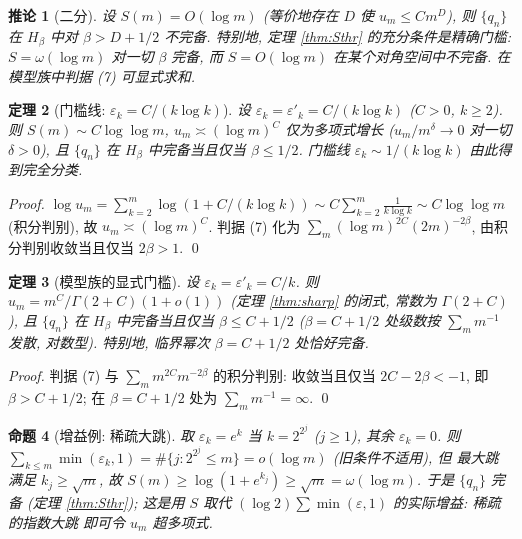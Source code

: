 \documentclass[UTF8]{ctexart}
\newtheorem{theorem}{定理}[section]
\newtheorem{corollary}[theorem]{推论}
\newtheorem{proposition}[theorem]{命题}
\begin{document}
\begin{corollary}[二分]\label{cor:di}
	设 $S(m) = O(\log m)$ (等价地存在 $D$ 使 $u_m \leq C m^D$),
	则 $\{q_n\}$ 在 $H_\beta$ 中对 $\beta > D + 1/2$ 不完备.
	特别地, 定理 \ref{thm:Sthr} 的充分条件是\emph{精确门槛}:
	$S = \omega(\log m)$ 对一切 $\beta$ 完备, 而 $S = O(\log m)$
	在某个对角空间中不完备. 在模型族中判据 (7) 可显式求和.
\end{corollary}

\begin{theorem}[门槛线: $\varepsilon_k = C/(k\log k)$]\label{thm:line}
	设 $\varepsilon_k = \varepsilon'_k = C/(k\log k)$ ($C > 0$, $k \geq 2$).
	则 $S(m) \sim C\log\log m$, $u_m \asymp (\log m)^C$ 仅为多项式增长
	($u_m/m^\delta \to 0$ 对一切 $\delta > 0$), 且 $\{q_n\}$ 在 $H_\beta$
	中完备当且仅当 $\beta \leq 1/2$. 门槛线 $\varepsilon_k \sim 1/(k\log k)$
	由此得到\emph{完全分类}.
\end{theorem}

\begin{proof}
	$\log u_m = \sum_{k=2}^m \log(1 + C/(k\log k)) \sim C \sum_{k=2}^m
	\frac{1}{k\log k} \sim C\log\log m$ (积分判别), 故
	$u_m \asymp (\log m)^C$. 判据 (7) 化为 $\sum_m (\log m)^{2C}(2m)^{-2\beta}$,
	由积分判别收敛当且仅当 $2\beta > 1$. \qed
\end{proof}

\begin{theorem}[模型族的显式门槛]\label{thm:model}
	设 $\varepsilon_k = \varepsilon'_k = C/k$. 则 $u_m = m^C/\Gamma(2+C)(1+o(1))$
	(定理 \ref{thm:sharp} 的闭式, 常数为 $\Gamma(2+C)$), 且
	$\{q_n\}$ 在 $H_\beta$ 中完备当且仅当 $\beta \leq C + 1/2$
	($\beta = C+1/2$ 处级数按 $\sum_m m^{-1}$ 发散, 对数型). 特别地,
	临界幂次 $\beta = C+1/2$ 处\emph{恰好}完备.
\end{theorem}

\begin{proof}
	判据 (7) 与 $\sum_m m^{2C} m^{-2\beta}$ 的积分判别:
	收敛当且仅当 $2C - 2\beta < -1$, 即 $\beta > C+1/2$; 在
	$\beta = C+1/2$ 处为 $\sum_m m^{-1} = \infty$. \qed
\end{proof}

\begin{proposition}[增益例: 稀疏大跳]\label{prop:sparse}
	取 $\varepsilon_k = e^{k}$ 当 $k = 2^{2^j}$ ($j \geq 1$), 其余
	$\varepsilon_k = 0$. 则 $\sum_{k \leq m} \min(\varepsilon_k,1)
	= \#\{j: 2^{2^j} \leq m\} = o(\log m)$ (旧条件不适用), 但
	最大跳满足 $k_j \geq \sqrt m$, 故
	$S(m) \geq \log(1+e^{k_j}) \geq \sqrt m = \omega(\log m)$. 于是
	$\{q_n\}$ 完备 (定理 \ref{thm:Sthr}); 这是用 $S$ 取代
	$(\log 2)\sum\min(\varepsilon,1)$ 的实际增益: 稀疏的指数大跳
	即可令 $u_m$ 超多项式.
\end{proposition}
\end{document}
